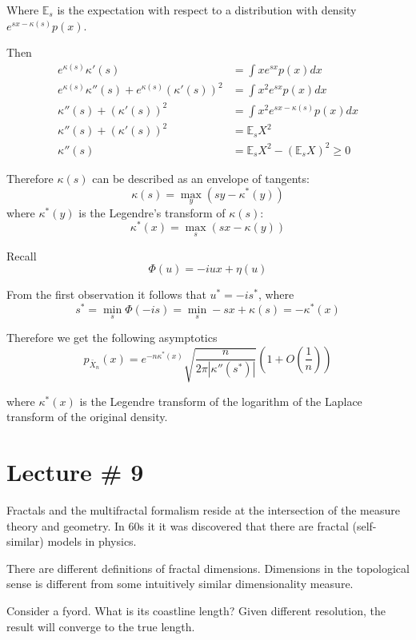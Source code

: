 \documentclass[a4paper]{article}
\newcommand{\brac}[1]{{\left ( #1 \right )}}
\newcommand{\abs}[1]{{\left | #1 \right |}}
\newcommand{\Ex}{\mathbb{E}}
\begin{document}
Where $\Ex_s$ is the expectation with respect to a distribution with density $e^{sx - \kappa(s)} p(x)$.

Then
\begin{align*}
	e^{\kappa(s)} \kappa'(s) &= \int xe^{sx} p(x) dx \\
	e^{\kappa(s)} \kappa''(s) + e^{\kappa(s)} \brac{\kappa'(s)}^2 &= \int x^2 e^{sx} p(x) dx \\
	\kappa''(s) + \brac{\kappa'(s)}^2 &= \int x^2 e^{sx-\kappa(s)} p(x) dx \\
	\kappa''(s) + \brac{\kappa'(s)}^2 &= \Ex_s X^2 \\
	\kappa''(s) &= \Ex_s X^2 - \brac{\Ex_s X}^2\geq 0
\end{align*}

Therefore $\kappa(s)$ can be described as an envelope of tangents:
\[ \kappa(s) = \max_{y} \brac{sy - \kappa^*(y)} \]
where $\kappa^*(y)$ is the Legendre's transform of $\kappa(s)$:
\[ \kappa^*(x) = \max_{s} \brac{sx - \kappa(y)} \]

Recall 
\[\Phi(u) = - iux +\eta(u)\]

From the first observation it follows that $u^* = -is^*$, where
\[s^* = \min_{s}\Phi(-is) = \min_{s} -sx + \kappa(s) = - \kappa^*(x)\]

Therefore we get the following asymptotics
\[p_{\bar{X}_n}(x) = e^{-n\kappa^*(x)} \sqrt{\frac{n}{2\pi \abs{\kappa''(s^*)}}}\brac{1+O(\frac{1}{n})}\]

where $\kappa^*(x)$ is the Legendre transform of the logarithm of the Laplace transform of the original density.




\section{Lecture \# 9} %
\label{sec:lecture_9}

Fractals and the multifractal formalism reside at the intersection of the measure theory and geometry. In 60s it it was discovered that there are fractal (self-similar) models in physics.

There are different definitions of fractal dimensions.
Dimensions in the topological sense is different from some intuitively similar dimensionality measure.

Consider a fyord. What is its coastline length? Given different resolution, the result will converge to the true length.
\end{document}
